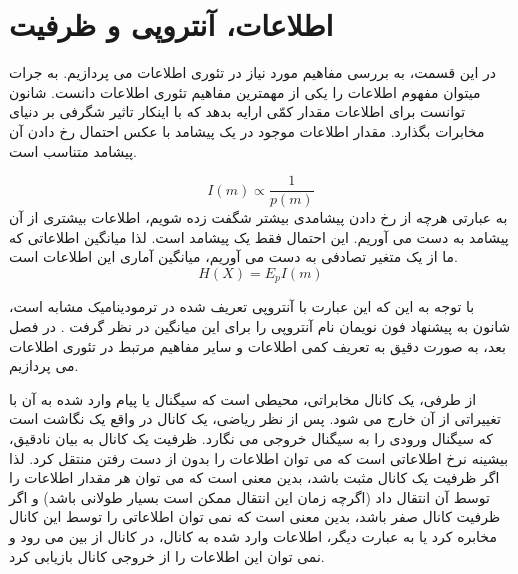 \section{اطلاعات، آنتروپی و ظرفیت}

در این قسمت، به بررسی مفاهیم مورد نیاز در تئوری اطلاعات می پردازیم. به جرات میتوان مفهوم اطلاعات را یکی از مهمترین مفاهیم تئوری اطلاعات دانست. شانون توانست برای اطلاعات مقدار کمّی ارایه بدهد که با اینکار تاثیر شگرفی بر دنیای مخابرات بگذارد. مقدار اطلاعات موجود در یک پیشامد با عکس احتمال رخ دادن آن پیشامد متناسب است. 

\begin{equation}
	I(m) \propto \frac{1}{p(m)}
\end{equation}
به عبارتی هرچه از رخ دادن پیشامدی بیشتر شگفت زده شویم، اطلاعات بیشتری از آن پیشامد به دست می آوریم. این احتمال فقط یک پیشامد است. لذا میانگین اطلاعاتی که ما از یک متغیر تصادفی به دست می آوریم، میانگین آماری این اطلاعات است. 
\begin{equation}
	H(X) = E_p I(m)
\end{equation}

با توجه به این که این عبارت با آنتروپی تعریف شده در ترمودینامیک مشابه است، شانون به پیشنهاد فون نویمان
نام آنتروپی را برای این میانگین در نظر گرفت
\cite{intro}.
در فصل بعد، به صورت دقیق به تعریف کمی اطلاعات و سایر مفاهیم مرتبط در تئوری اطلاعات می پردازیم.

از طرفی، یک کانال مخابراتی، محیطی است که سیگنال یا پیام وارد شده به آن با تغییراتی از آن خارج می شود. پس از نظر ریاضی، یک کانال در واقع یک نگاشت است که سیگنال ورودی را به سیگنال خروجی می نگارد. ظرفیت یک کانال به بیان نادقیق، بیشینه نرخ اطلاعاتی است که می توان اطلاعات را بدون از دست رفتن منتقل کرد. لذا اگر ظرفیت یک کانال مثبت باشد، بدین معنی است که می توان هر مقدار اطلاعات را توسط آن انتقال داد (اگرچه زمان این انتقال ممکن است بسیار طولانی باشد) و اگر ظرفیت کانال صفر باشد، بدین معنی است که نمی توان اطلاعاتی را توسط این کانال مخابره کرد یا به عبارت دیگر، اطلاعات وارد شده به کانال، در کانال از بین می رود و نمی توان این اطلاعات را از خروجی کانال بازیابی کرد.